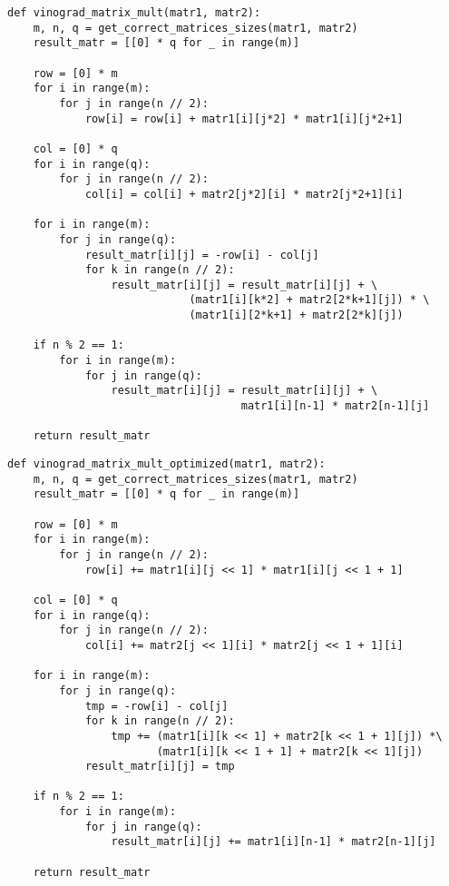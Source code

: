 \begin{lstlisting}[label=lst:vinograd,caption=Алгоритм Винограда умножения матриц]
def vinograd_matrix_mult(matr1, matr2):
    m, n, q = get_correct_matrices_sizes(matr1, matr2)
    result_matr = [[0] * q for _ in range(m)]

    row = [0] * m
    for i in range(m):
        for j in range(n // 2):
            row[i] = row[i] + matr1[i][j*2] * matr1[i][j*2+1]

    col = [0] * q
    for i in range(q):
        for j in range(n // 2):
            col[i] = col[i] + matr2[j*2][i] * matr2[j*2+1][i]

    for i in range(m):
        for j in range(q):
            result_matr[i][j] = -row[i] - col[j]
            for k in range(n // 2):
                result_matr[i][j] = result_matr[i][j] + \
                            (matr1[i][k*2] + matr2[2*k+1][j]) * \
                            (matr1[i][2*k+1] + matr2[2*k][j])

    if n % 2 == 1:
        for i in range(m):
            for j in range(q):
                result_matr[i][j] = result_matr[i][j] + \ 
                                    matr1[i][n-1] * matr2[n-1][j]

    return result_matr
\end{lstlisting}
\clearpage

\begin{lstlisting}[label=lst:vinograd_opt,caption=Оптимизированный алгоритм Винограда умножения матриц]
def vinograd_matrix_mult_optimized(matr1, matr2):
    m, n, q = get_correct_matrices_sizes(matr1, matr2)
    result_matr = [[0] * q for _ in range(m)]

    row = [0] * m
    for i in range(m):
        for j in range(n // 2):
            row[i] += matr1[i][j << 1] * matr1[i][j << 1 + 1]

    col = [0] * q
    for i in range(q):
        for j in range(n // 2):
            col[i] += matr2[j << 1][i] * matr2[j << 1 + 1][i]

    for i in range(m):
        for j in range(q):
            tmp = -row[i] - col[j]
            for k in range(n // 2):
                tmp += (matr1[i][k << 1] + matr2[k << 1 + 1][j]) *\
                       (matr1[i][k << 1 + 1] + matr2[k << 1][j])
            result_matr[i][j] = tmp

    if n % 2 == 1:
        for i in range(m):
            for j in range(q):
                result_matr[i][j] += matr1[i][n-1] * matr2[n-1][j]

    return result_matr
\end{lstlisting}
\clearpage


